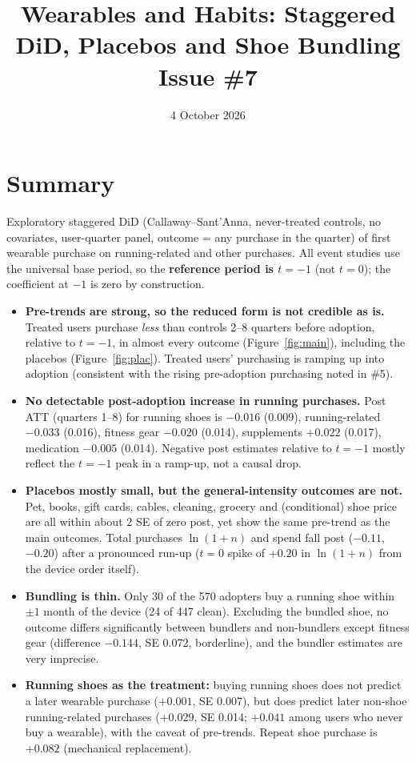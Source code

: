 \documentclass[11pt]{article}
\title{Wearables and Habits: Staggered DiD, Placebos and Shoe Bundling\\\large Issue \#7}
\date{4 October 2026}
\author{}
\begin{document}
\maketitle

\section{Summary}
Exploratory staggered DiD (Callaway--Sant'Anna, never-treated controls, no covariates, user-quarter panel, outcome = any purchase in the quarter) of first wearable purchase on running-related and other purchases. All event studies use the universal base period, so the \textbf{reference period is $t=-1$} (not $t=0$); the coefficient at $-1$ is zero by construction.
\begin{itemize}[nosep]
\item \textbf{Pre-trends are strong, so the reduced form is not credible as is.} Treated users purchase \emph{less} than controls 2--8 quarters before adoption, relative to $t=-1$, in almost every outcome (Figure~\ref{fig:main}), including the placebos (Figure~\ref{fig:plac}). Treated users' purchasing is ramping up into adoption (consistent with the rising pre-adoption purchasing noted in \#5).
\item \textbf{No detectable post-adoption increase in running purchases.} Post ATT (quarters 1--8) for running shoes is $-0.016$ (0.009), running-related $-0.033$ (0.016), fitness gear $-0.020$ (0.014), supplements $+0.022$ (0.017), medication $-0.005$ (0.014). Negative post estimates relative to $t=-1$ mostly reflect the $t=-1$ peak in a ramp-up, not a causal drop.
\item \textbf{Placebos mostly small, but the general-intensity outcomes are not.} Pet, books, gift cards, cables, cleaning, grocery and (conditional) shoe price are all within about 2 SE of zero post, yet show the same pre-trend as the main outcomes. Total purchases $\ln(1+n)$ and spend fall post ($-0.11$, $-0.20$) after a pronounced run-up ($t=0$ spike of $+0.20$ in $\ln(1+n)$ from the device order itself).
\item \textbf{Bundling is thin.} Only 30 of the 570 adopters buy a running shoe within $\pm1$ month of the device (24 of 447 clean). Excluding the bundled shoe, no outcome differs significantly between bundlers and non-bundlers except fitness gear (difference $-0.144$, SE 0.072, borderline), and the bundler estimates are very imprecise.
\item \textbf{Running shoes as the treatment:} buying running shoes does not predict a later wearable purchase ($+0.001$, SE 0.007), but does predict later non-shoe running-related purchases ($+0.029$, SE 0.014; $+0.041$ among users who never buy a wearable), with the caveat of pre-trends. Repeat shoe purchase is $+0.082$ (mechanical replacement).
\end{itemize}
\end{document}
